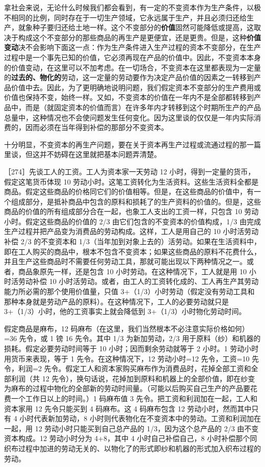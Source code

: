 拿社会来说，无论什么时候我们都会看到，有一定的不变资本作为生产条件，以极不相同的比例，同时存在于一切生产领域，它永远属于生产，并且必须归还给生产，就象种子要归还给土地一样。这个不变部分的\textbf{价值}固然可能降低或提高，这取决于构成这个不变部分的那些商品的再生产是更便宜，还是更贵。但是，这种\textbf{价值变动}决不会影响下面这一点：作为生产条件进入生产过程的资本不变部分，在生产过程中是一个事先已知的价值，它必须再现在产品的价值中。因此，不变资本本身的价值变动，在这里可以不加考虑。在一切场合，不变资本在这里都表现为一定量的\textbf{过去的、物化的}劳动，这一定量的劳动要作为决定产品价值的因素之一转移到产品价值中去。因此，为了更明确地说明问题，我们假定资本不变部分的生产费用或价值也保持不变，始终一样。又如，不变资本的价值在一年内不是全部都转移到产品中，而是（就固定资本的价值而言）在许多年内才转移到这个时期所生产的产品总量中，这种情况也不会使问题发生任何变化。因为这里谈的仅仅是一年内实际消费的，因而必须在当年得到补偿的那部分不变资本。

十分明显，不变资本的再生产问题，要在关于资本再生产过程或流通过程的那一篇里谈，但这并不妨碍在这里就把基本问题弄清楚。

［274］先谈工人的工资。工人为资本家一天劳动 12 小时，得到一定量的货币，假定这笔货币体现 10 劳动小时。这笔工资转化为生活资料。这些生活资料全都是商品。假定这些商品的价格同它们的价值相等。但是，在这些商品的价值中，有一个组成部分，是抵补商品中包含的原料和损耗了的生产资料的价值的。但是，这些商品的价值的所有组成部分合在一起，也象工人支出的工资一样，只包含 10 劳动小时。假定这些商品的价值的 2/3 由它们包含的不变资本的价值构成，1/3 由完成生产过程并把产品变为消费品的劳动构成。这样，工人是用自己的 10 小时活劳动补偿 2/3 的不变资本和 1/3（当年加到对象上去的）活劳动。如果在生活资料中，即在工人购买的商品中，根本不包含不变资本；如果这些商品的原料不花费什么，并且生产这些商品时不需要任何劳动工具，那就可能出现以下两种情况之一。或者，商品象原先一样，还是包含 10 小时劳动。在这种情况下，工人就是用 10 小时活劳动补偿 10 小时活劳动。或者，由工人的工资转化成的、工人再生产其劳动能力所必需的那个使用价值量，只值 3+（1/3）小时劳动（假定没有劳动工具和那种本身就是劳动产品的原料）。在这种情况下，工人的必要劳动就只是 3+（1/3）小时，他的工资事实上就会降低到 3+（1/3）小时物化劳动时间。

假定商品是麻布，12 码麻布（在这里，我们当然根本不必注意实际价格如何）=36 先令，或 1 镑 16 先令。其中 1/3 为新加劳动，2/3 用于原料（纱）和机器的损耗。假定必要劳动时间等于 10 小时；因而剩余劳动就等于 2 小时。1 劳动小时用货币来表现，等于 1 先令。在这种情况下，12 劳动小时=12 先令，工资=10 先令，利润=2 先令。假定工人和资本家购买麻布作为消费品时，花掉全部工资和全部利润（共 12 先令），换句话说，花掉加到原料和机器上的全部价值，即在纱变为麻布的过程中物化的全部新的劳动时间量。（可能以后购买自己生产的产品要花费一个工作日以上的时间。）1 码麻布值 3 先令。把工资和利润加在一起，工人和资本家用 12 先令只能买到 4 码麻布。这 4 码麻布包含 12 劳动小时，然而其中只有 4 小时代表新加劳动，8 小时则代表物化在不变资本中的劳动。工资和利润加在一起，用 12 劳动小时只能买到自己总产品的 1/3，因为这个总产品的 2/3 由不变资本构成。12 劳动小时分为 4+8，其中 4 小时自己补偿自己，8 小时补偿那个同织布过程中加进的劳动无关的、以物化了的形式即纱和机器的形式加入织布过程的劳动。

